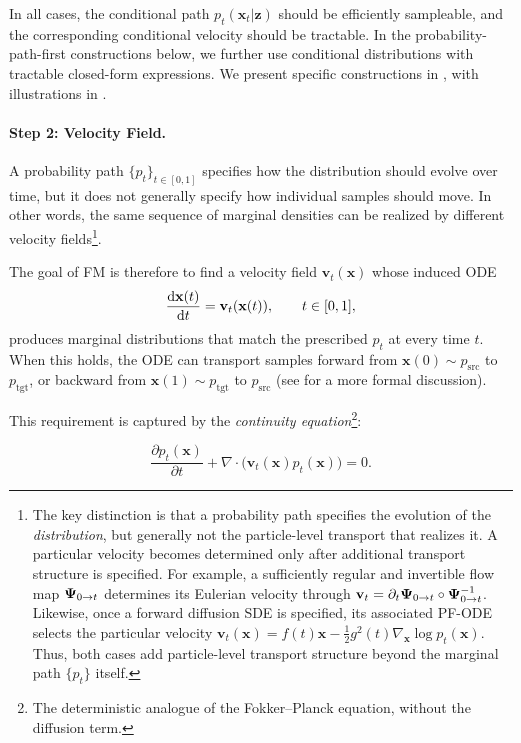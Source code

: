 In all cases, the conditional path $p_t(\mathbf{x}_t|\mathbf{z})$ should be
efficiently sampleable, and the corresponding conditional velocity should be
tractable. In the probability-path-first constructions below, we further use
conditional distributions with tractable closed-form expressions. We present
specific constructions in , with illustrations
in .

\paragraph{Step 2: Velocity Field.}
A probability path $\{p_t\}_{t\in[0,1]}$ specifies how the distribution
should evolve over time, but it does not generally specify how individual
samples should move. In other words, the same sequence of marginal densities
can be realized by different velocity fields\footnote{
The key distinction is that a probability path specifies the evolution of
the \emph{distribution}, but generally not the particle-level transport that
realizes it. A particular velocity becomes determined only after additional
transport structure is specified. For example, a sufficiently regular and
invertible flow map ${\bm{\Psi}}_{0\to t}$ determines its Eulerian velocity through
$\mathbf{v}_t=\partial_t{\bm{\Psi}}_{0\to t}\circ{\bm{\Psi}}_{0\to t}^{-1}$.
Likewise, once a forward diffusion SDE is specified, its associated PF-ODE
selects the particular velocity
$\mathbf{v}_t(\mathbf{x})
=
f(t)\mathbf{x}
-\tfrac12g^2(t)\nabla_{\mathbf{x}}\log p_t(\mathbf{x})$.
Thus, both cases add particle-level transport structure beyond the marginal
path $\{p_t\}$ itself.
}.

The goal of FM is therefore to find a velocity field
$\mathbf{v}_t(\mathbf{x})$ whose induced ODE
\[
\frac{\mathop{}\!\mathrm{d} \mathbf{x}(t)}{\mathop{}\!\mathrm{d} t}
=
\mathbf{v}_t(\mathbf{x}(t)),
\qquad
t\in[0,1],
\]
produces marginal distributions that match the prescribed $p_t$ at every
time $t$. When this holds, the ODE can transport samples forward from
$\mathbf{x}(0)\sim p_{\text{src}}$ to $p_{\text{tgt}}$, or backward from
$\mathbf{x}(1)\sim p_{\text{tgt}}$ to $p_{\text{src}}$
(see  for a more formal discussion).

This requirement is captured by the \emph{continuity equation}\footnote{
The deterministic analogue of the Fokker--Planck equation, without the
diffusion term.}:
\begin{mdframed}
\begin{equation}\label{eq:continuity_eq}
    \frac{\partial p_t(\mathbf{x})}{\partial t}
    +
    \nabla\cdot
    \bigl(
    \mathbf{v}_t(\mathbf{x})p_t(\mathbf{x})
    \bigr)
    =
    0.
\end{equation}
\end{mdframed}

